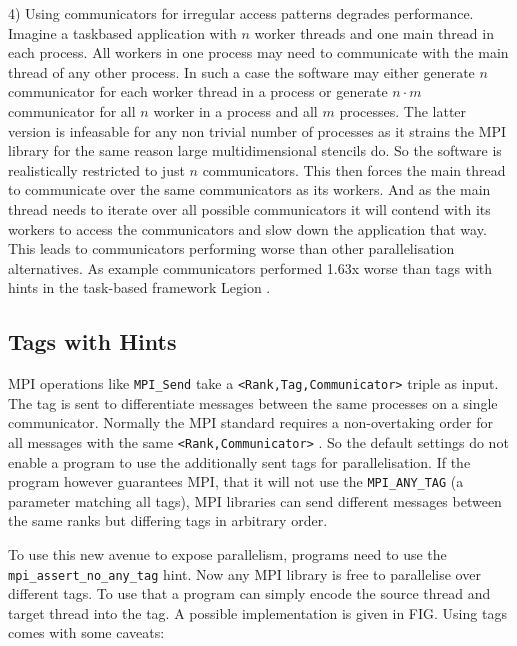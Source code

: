 \documentclass[sigconf]{acmart}
\begin{document}
4) Using communicators for irregular access patterns degrades performance.
Imagine a taskbased application with $n$ worker threads and one main thread in each process.
All workers in one process may need to communicate with the main thread of any other process.
In such a case the software may either generate $n$ communicator for each worker thread in a process or generate $n \cdot m$ communicator for all $n$ worker in a process and all $m$ processes.
The latter version is infeasable for any non trivial number of processes as it strains the MPI library for the same reason large multidimensional stencils do.
So the software is realistically restricted to just $n$ communicators.
This then forces the main thread to communicate over the same communicators as its workers.
And as the main thread needs to iterate over all possible communicators it will contend with its workers to access the communicators and slow down the application that way.
This leads to communicators performing worse than other parallelisation alternatives.
As example communicators performed 1.63x worse than tags with hints in the task-based framework Legion \cite{zambreLogicalParallel2021}.

\subsection{Tags with Hints}

MPI operations like \verb|MPI_Send| take a \verb|<Rank,Tag,Communicator>| triple as input.
The tag is sent to differentiate messages between the same processes on a single communicator.
Normally the MPI standard requires a non-overtaking order for all messages with the same \verb|<Rank,Communicator>| \cite{mpi40}.
So the default settings do not enable a program to use the additionally sent tags for parallelisation.
If the program however guarantees MPI, that it will not use the \verb|MPI_ANY_TAG| (a parameter matching all tags), MPI libraries can send different messages between the same ranks but differing tags in arbitrary order.

To use this new avenue to expose parallelism, programs need to use the \verb|mpi_assert_no_any_tag| hint.
Now any MPI library is free to parallelise over different tags.
To use that a program can simply encode the source thread and target thread into the tag.
A possible implementation is given in FIG. %
Using tags comes with some caveats:
\end{document}
